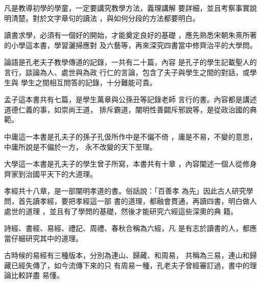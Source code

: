 \documentclass[avery5371,grid]{flashcards}
\begin{document}
{凡是教導初學的學童，一定要講究教學方法，義理講解
要詳細，並且考察事實說明清楚。對於文字章句的讀法
，與如何分段的方法都要明白。} %
{} %

{讀書求學，必須有一個好的開始，才能奠定良好的基礎
，應先熟悉宋朝朱熹所著的小學這本書，學習灑掃應對
及六藝等，再來深究四書當中修齊治平的大學問。} %
{} %

{論語是孔老夫子教學傳道的記錄，一共有二十篇，內容
是孔子的學生記載聖人的言行，談論為人、處世與為政
行仁的言論，包含了夫子與學生之間的對話，或學生與
學生之間相互問答的記錄，十分難能可貴。} %
{} %





{孟子這本書共有七篇，是學生萬章與公孫丑等記錄老師
言行的書。內容都是講述道德仁義的事，如崇尚王道，
排斥霸道，闡明性善闢斥邪說等，是從政治國的典範。} %
{} %

{中庸這一本書是孔夫子的孫子孔伋所作中是不偏不倚
，庸是不易，不變的意思，中庸所說是不偏於一方，
永不改變的天下至理。} %
{} %

{大學這一本書是孔夫子的學生曾子所寫，本書共有十章
，內容闡述一個人從修身齊家到治國平天下的大道理。} %
{} %

{孝經共十八章，是一部闡明孝道的書。俗話說：「百善孝
為先」因此古人研究學問，首先讀孝經，要把孝經這一部
書的道理，都融會貫通，再讀四書，明白做人處世的道理
，並且有了學問的基礎，然後才能研究六經這些深奧的典
籍。} %
{} %

{詩經、書經、易經、禮記、周禮、春秋合稱為六經，凡
是有志於讀書的人，都應當仔細研究其中的道理。} %
{} %

{古時候的易經有三種版本，分別為連山、歸藏、和周易，
共稱為三易，連山和歸藏已經失傳了，如今流傳下來的只
有周易一種，孔老夫子曾經審訂過，書中的理論比較詳盡
易懂。} %
{} %
\end{document}
